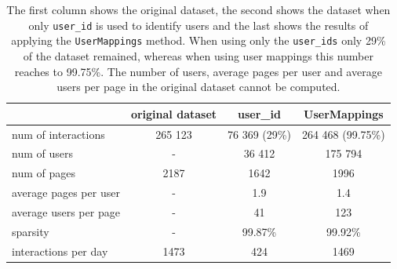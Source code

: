 \begin{table}[h!]
    \centering
    \begin{tabular}{@{}lccc@{}}
    \toprule
                           & \textbf{original dataset} & \cellcolor[HTML]{A4C2F4}\textbf{user\_id} & \cellcolor[HTML]{FFCCC9}\textbf{UserMappings} \\ \midrule
    \rowcolor[HTML]{EFEFEF} 
    num of interactions    & 265 123                   & 76 369 (29\%)                             & 264 468 (99.75\%)                               \\
    num of users           & -                         & 36 412                                    & 175 794                                         \\
    \rowcolor[HTML]{EFEFEF} 
    num of pages           & 2187                      & 1642                                      & 1996                                            \\
    average pages per user & -                         & 1.9                                       & 1.4                                             \\
    \rowcolor[HTML]{EFEFEF} 
    average users per page & -                         & 41                                        & 123                                             \\
    sparsity               & -                         & 99.87\%                                   & 99.92\%                                         \\
    \rowcolor[HTML]{EFEFEF} 
    interactions per day   & 1473                      & 424                                       & 1469                                            \\ \bottomrule
    \end{tabular}
    \caption{The first column shows the original dataset, the second shows the dataset when only \texttt{user\_id} is used to identify users and the last shows the results of applying the \texttt{UserMappings} method. When using only the \texttt{user\_ids} only 29\% of the dataset remained, whereas when using user mappings this number reaches to 99.75\%. The number of users, average pages per user and average users per page in the original dataset cannot be computed.}
    \label{tab:dataset_comparison}
\end{table}

